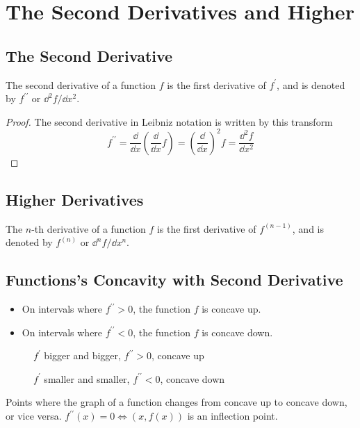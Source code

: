\section{The Second Derivatives and Higher}
\subsection{The Second Derivative}
The second derivative of a function $f$ is the first derivative of $f^\prime$, and is denoted by $f^{\prime\prime}$ or $\dd^2 f/\dd x^2$.
\begin{proof}
  The second derivative in Leibniz notation is written by this transform
  \[
  f^{\prime\prime}
  =\frac\dd{\dd x}\left(\frac\dd{\dd x}f\right)
  =\left(\frac\dd{\dd x}\right)^2 f
  =\frac{\dd^2 f}{\dd x^2}
  \]
\end{proof}

\subsection{Higher Derivatives}
The $n$-th derivative of a function $f$ is the first derivative of $f^{(n-1)}$, and is denoted by $f^{(n)}$ or $\dd^n f/\dd x^n$.

\subsection{Functions's Concavity with Second Derivative}
\begin{itemize}
\item On intervals where $f^{\prime\prime}>0$, the function $f$ is concave up.
\item On intervals where $f^{\prime\prime}<0$, the function $f$ is concave down.
\end{itemize}
\begin{figure}[H]
  \centering
  \caption{$f^\prime$ bigger and bigger, $f^{\prime\prime}>0$, concave up}
\end{figure}
\begin{figure}[H]
  \centering
  \caption{$f^\prime$ smaller and smaller, $f^{\prime\prime}<0$, concave down}
\end{figure}
\begin{definition}
Points where the graph of a function changes from concave up to concave down, or vice versa. $f^{\prime\prime}(x)=0\iff(x,f(x))$ is an inflection point.
\end{definition}

